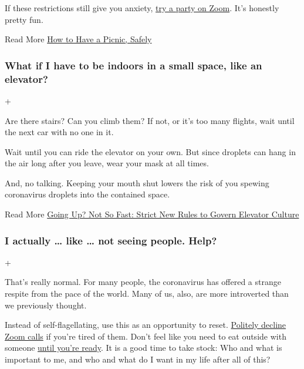 If these restrictions still give you anxiety,
\href{https://www.nytimes3xbfgragh.onion/2020/05/02/smarter-living/zoom-birthday-party.html}{try
a party on Zoom}. It's honestly pretty fun.

 Read More
\href{https://www.nytimes3xbfgragh.onion/2020/05/09/dining/coronavirus-how-to-have-a-picnic-safely.html}{How
to Have a Picnic, Safely}

\hypertarget{what-if-i-have-to-be-indoors-in-a-small-space-like-an-elevator}{%
\subsubsection{What if I have to be indoors in a small space, like an
elevator?}\label{what-if-i-have-to-be-indoors-in-a-small-space-like-an-elevator}}

+

Are there stairs? Can you climb them? If not, or it's too many flights,
wait until the next car with no one in it.

Wait until you can ride the elevator on your own. But since droplets can
hang in the air long after you leave, wear your mask at all times.

And, no talking. Keeping your mouth shut lowers the risk of you spewing
coronavirus droplets into the contained space.

 Read More
\href{https://www.nytimes3xbfgragh.onion/2020/06/26/health/coronavirus-elevator-reopen.html}{Going
Up? Not So Fast: Strict New Rules to Govern Elevator Culture}

\hypertarget{i-actually--like--not-seeing-people-help}{%
\subsubsection{I actually \ldots{} like \ldots{} not seeing people.
Help?}\label{i-actually--like--not-seeing-people-help}}

+

That's really normal. For many people, the coronavirus has offered a
strange respite from the pace of the world. Many of us, also, are more
introverted than we previously thought.

Instead of self-flagellating, use this as an opportunity to reset.
\href{https://www.nytimes3xbfgragh.onion/2020/05/20/smarter-living/coronavirus-zoom-facetime-fatigue.html}{Politely
decline Zoom calls} if you're tired of them. Don't feel like you need to
eat outside with someone
\href{https://www.nytimes3xbfgragh.onion/2020/07/09/style/coronavirus-backyard-entertaining.html}{until
you're ready}. It is a good time to take stock: Who and what is
important to me, and who and what do I want in my life after all of
this?

